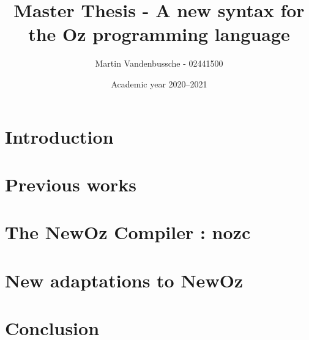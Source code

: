 \documentclass[a4paper,11pt]{scrreprt}
\title{Master Thesis - A new syntax for the Oz programming language}
\author{Martin Vandenbussche - 02441500}
\date{Academic year 2020--2021}
\begin{document}
\maketitle

\tableofcontents


\medskip

\chapter{Introduction}\label{ch:intro}


\chapter{Previous works}\label{ch:1}


\chapter{The NewOz Compiler : nozc}\label{ch:2}


\chapter{New adaptations to NewOz}\label{ch:3}


\chapter{Conclusion}\label{ch:conclusion}


\begin{appendices}

\end{appendices}

\printbibliography
\end{document}
